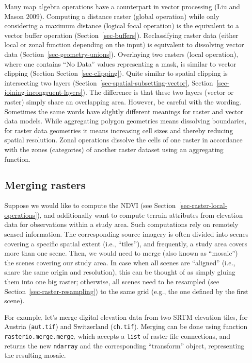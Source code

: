 \documentclass[
  letterpaper,
]{krantz}
\begin{document}
Many map algebra operations have a counterpart in vector processing (Liu
and Mason 2009). Computing a distance raster (global operation) while
only considering a maximum distance (logical focal operation) is the
equivalent to a vector buffer operation (Section~\ref{sec-buffers}).
Reclassifying raster data (either local or zonal function depending on
the input) is equivalent to dissolving vector data
(Section~\ref{sec-geometry-unions}). Overlaying two rasters (local
operation), where one contains ``No Data'' values representing a mask,
is similar to vector clipping (Section Section~\ref{sec-clipping}).
Quite similar to spatial clipping is intersecting two layers
(Section~\ref{sec-spatial-subsetting-vector},
Section~\ref{sec-joining-incongruent-layers}). The difference is that
these two layers (vector or raster) simply share an overlapping area.
However, be careful with the wording. Sometimes the same words have
slightly different meanings for raster and vector data models. While
aggregating polygon geometries means dissolving boundaries, for raster
data geometries it means increasing cell sizes and thereby reducing
spatial resolution. Zonal operations dissolve the cells of one raster in
accordance with the zones (categories) of another raster dataset using
an aggregating function.

\subsection{Merging rasters}\label{sec-merging-rasters}

Suppose we would like to compute the NDVI (see
Section~\ref{sec-raster-local-operations}), and additionally want to
compute terrain attributes from elevation data for observations within a
study area. Such computations rely on remotely sensed information. The
corresponding source imagery is often divided into scenes covering a
specific spatial extent (i.e., ``tiles''), and frequently, a study area
covers more than one scene. Then, we would need to merge (also known as
``mosaic'') the scenes covering our study area. In case when all scenes
are ``aligned'' (i.e., share the same origin and resolution), this can
be thought of as simply gluing them into one big raster; otherwise, all
scenes need to be resampled (see Section~\ref{sec-raster-resampling}) to
the same grid (e.g., the one defined by the first scene).

For example, let's merge digital elevation data from two SRTM elevation
tiles, for Austria
(\texttt{\textquotesingle{}aut.tif\textquotesingle{}}) and Switzerland
(\texttt{\textquotesingle{}ch.tif\textquotesingle{}}). Merging can be
done using function \texttt{rasterio.merge.merge}, which accepts a
\texttt{list} of raster file connections, and returns the new
\texttt{ndarray} and the corresponding ``transform'' object,
representing the resulting mosaic.
\end{document}
